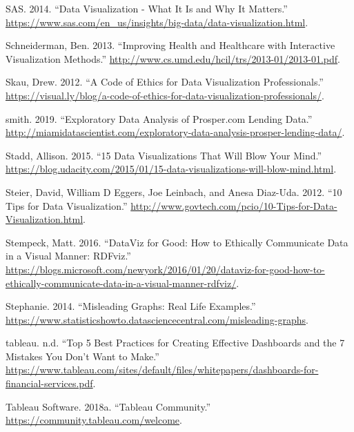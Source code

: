 \documentclass[]{book}
\begin{document}
\leavevmode\hypertarget{ref-why_dataviz_matters}{}%
SAS. 2014. ``Data Visualization - What It Is and Why It Matters.'' \url{https://www.sas.com/en_us/insights/big-data/data-visualization.html}.

\leavevmode\hypertarget{ref-data_viz_healthcare}{}%
Schneiderman, Ben. 2013. ``Improving Health and Healthcare with Interactive Visualization Methods.'' \url{http://www.cs.umd.edu/hcil/trs/2013-01/2013-01.pdf}.

\leavevmode\hypertarget{ref-ethics_code}{}%
Skau, Drew. 2012. ``A Code of Ethics for Data Visualization Professionals.'' \url{https://visual.ly/blog/a-code-of-ethics-for-data-visualization-professionals/}.

\leavevmode\hypertarget{ref-david_2019}{}%
smith. 2019. ``Exploratory Data Analysis of Prosper.com Lending Data.'' \url{http://miamidatascientist.com/exploratory-data-analysis-prosper-lending-data/}.

\leavevmode\hypertarget{ref-15_mindblowing}{}%
Stadd, Allison. 2015. ``15 Data Visualizations That Will Blow Your Mind.'' \url{https://blog.udacity.com/2015/01/15-data-visualizations-will-blow-mind.html}.

\leavevmode\hypertarget{ref-Steier}{}%
Steier, David, William D Eggers, Joe Leinbach, and Anesa Diaz-Uda. 2012. ``10 Tips for Data Visualization.'' \url{http://www.govtech.com/pcio/10-Tips-for-Data-Visualization.html}.

\leavevmode\hypertarget{ref-dataviz_for_good}{}%
Stempeck, Matt. 2016. ``DataViz for Good: How to Ethically Communicate Data in a Visual Manner: RDFviz.'' \url{https://blogs.microsoft.com/newyork/2016/01/20/dataviz-for-good-how-to-ethically-communicate-data-in-a-visual-manner-rdfviz/}.

\leavevmode\hypertarget{ref-missing_baseline}{}%
Stephanie. 2014. ``Misleading Graphs: Real Life Examples.'' \url{https://www.statisticshowto.datasciencecentral.com/misleading-graphs}.

\leavevmode\hypertarget{ref-dashboard_practices}{}%
tableau. n.d. ``Top 5 Best Practices for Creating Effective Dashboards and the 7 Mistakes You Don't Want to Make.'' \href{\%20https://www.tableau.com/sites/default/files/whitepapers/dashboards-for-financial-services.pdf\%20}{https://www.tableau.com/sites/default/files/whitepapers/dashboards-for-financial-services.pdf}.

\leavevmode\hypertarget{ref-Tableau_Community}{}%
Tableau Software. 2018a. ``Tableau Community.'' \url{https://community.tableau.com/welcome}.
\end{document}
